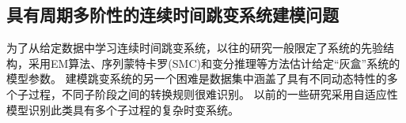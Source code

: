 \subsection{具有周期多阶性的连续时间跳变系统建模问题}
为了从给定数据中学习连续时间跳变系统，以往的研究一般限定了系统的先验结构，采用EM算法\cite{balenzuela2022parameter}、序列蒙特卡罗(SMC)\cite{6859280}和变分推理\cite{opper2007variational}等方法估计给定“灰盒”系统的模型参数。
建模跳变系统的另一个困难是数据集中涵盖了具有不同动态特性的多个子过程，不同子阶段之间的转换规则很难识别。
以前的一些研究采用自适应性模型识别此类具有多个子过程的复杂时变系统。
